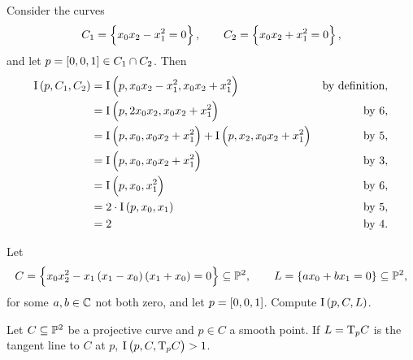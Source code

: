 \pagebreak

\begin{example}
Consider the curves
$$ C_1 = \cbr{x_0x_2 - x_1^2 = 0}, \qquad C_2 = \cbr{x_0x_2 + x_1^2 = 0}, $$
and let $ p = \sbr{0, 0, 1} \in C_1 \cap C_2 $. Then
\begin{align*}
\I\br{p, C_1, C_2}
& = \I\br{p, x_0x_2 - x_1^2, x_0x_2 + x_1^2} & \text{by definition}, \\
& = \I\br{p, 2x_0x_2, x_0x_2 + x_1^2} & \text{by} \ 6, \\
& = \I\br{p, x_0, x_0x_2 + x_1^2} + \I\br{p, x_2, x_0x_2 + x_1^2} & \text{by} \ 5, \\
& = \I\br{p, x_0, x_0x_2 + x_1^2} & \text{by} \ 3, \\
& = \I\br{p, x_0, x_1^2} & \text{by} \ 6, \\
& = 2 \cdot \I\br{p, x_0, x_1} & \text{by} \ 5, \\
& = 2 & \text{by} \ 4.
\end{align*}
\end{example}


\begin{exercise**}
Let
$$ C = \cbr{x_0x_2^2 - x_1\br{x_1 - x_0}\br{x_1 + x_0} = 0} \subseteq \PP^2, \qquad L = \cbr{ax_0 + bx_1 = 0} \subseteq \PP^2, $$
for some $ a, b \in \mathbb{C} $ not both zero, and let $ p = \sbr{0, 0, 1} $. Compute $ \I\br{p, C, L} $.
\end{exercise**}

\begin{proposition}
Let $ C \subseteq \mathbb{P}^2 $ be a projective curve and $ p \in C $ a smooth point. If $ L = \mathrm{T}_p C $ is the tangent line to $ C $ at $ p $, $ \I\br{p, C, \T_p C} > 1 $.
\end{proposition}

